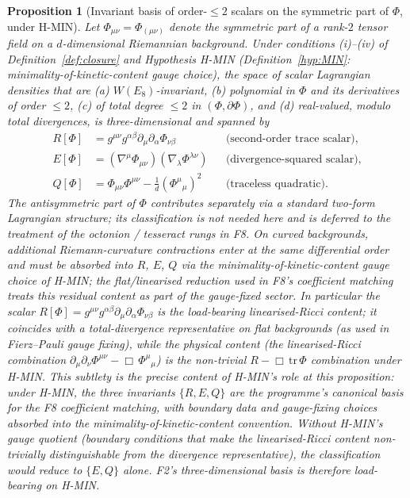 \documentclass[12pt]{article}
\newtheorem{proposition}[theorem]{Proposition}
\theoremstyle{definition}
\theoremstyle{remark}
\begin{document}
\begin{proposition}[Invariant basis of order-$\le 2$ scalars on the symmetric part of $\Phi$, under H-MIN]\label{prop:F2-basis}
Let $\Phi_{\mu\nu} = \Phi_{(\mu\nu)}$ denote the symmetric part of a rank-$2$ tensor field on a $d$-dimensional Riemannian background. Under conditions (i)--(iv) of Definition~\ref{def:closure} and Hypothesis H-MIN (Definition~\ref{hyp:MIN}: minimality-of-kinetic-content gauge choice), the space of scalar Lagrangian densities that are \textup{(a)} $W(E_8)$-invariant, \textup{(b)} polynomial in $\Phi$ and its derivatives of order $\le 2$, \textup{(c)} of total degree $\le 2$ in $(\Phi, \partial\Phi)$, and \textup{(d)} real-valued, modulo total divergences, is three-dimensional and spanned by
\begin{align}
R[\Phi] &= g^{\mu\nu} g^{\alpha\beta} \partial_\mu \partial_\alpha \Phi_{\nu\beta} &&\text{(second-order trace scalar)},\\
E[\Phi] &= (\nabla^\mu \Phi_{\mu\nu})(\nabla_\lambda \Phi^{\lambda\nu}) &&\text{(divergence-squared scalar)},\\
Q[\Phi] &= \Phi_{\mu\nu} \Phi^{\mu\nu} - \tfrac{1}{d} (\Phi^\mu{}_\mu)^2 &&\text{(traceless quadratic)}.
\end{align}
The antisymmetric part of $\Phi$ contributes separately via a standard two-form Lagrangian structure; its classification is not needed here and is deferred to the treatment of the octonion / tesseract rungs in F8. On curved backgrounds, additional Riemann-curvature contractions enter at the same differential order and must be absorbed into $R$, $E$, $Q$ via the minimality-of-kinetic-content gauge choice of H-MIN; the flat/linearised reduction used in F8's coefficient matching treats this residual content as part of the gauge-fixed sector. In particular the scalar $R[\Phi] = g^{\mu\nu}g^{\alpha\beta}\partial_\mu\partial_\alpha\Phi_{\nu\beta}$ is the load-bearing linearised-Ricci content; it coincides with a total-divergence representative on flat backgrounds (as used in Fierz--Pauli gauge fixing), while the physical content (the linearised-Ricci combination $\partial_\mu\partial_\nu\Phi^{\mu\nu} - \Box\,\Phi^\mu{}_\mu$) is the non-trivial $R - \Box\,\mathrm{tr}\,\Phi$ combination under H-MIN. This subtlety is the precise content of H-MIN's role at this proposition: under H-MIN, the three invariants $\{R, E, Q\}$ are the programme's canonical basis for the F8 coefficient matching, with boundary data and gauge-fixing choices absorbed into the minimality-of-kinetic-content convention. Without H-MIN's gauge quotient (boundary conditions that make the linearised-Ricci content non-trivially distinguishable from the divergence representative), the classification would reduce to $\{E, Q\}$ alone. F2's three-dimensional basis is therefore load-bearing on H-MIN.
\end{proposition}
\end{document}
